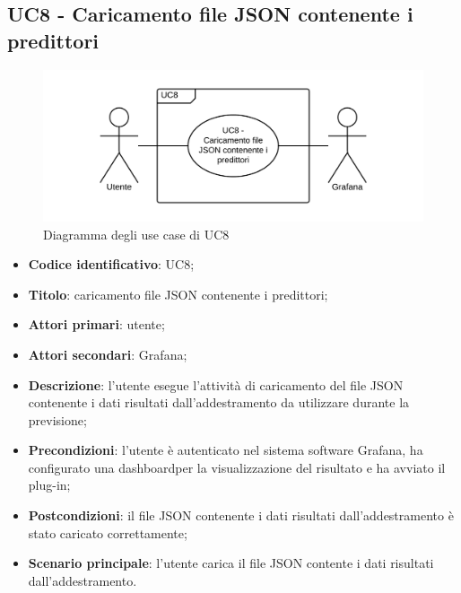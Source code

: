 \subsection{UC8 - Caricamento file JSON contenente i predittori}
\begin{figure}[H]
\includegraphics{img/UC8_-_Caricamento_file_JSON_contenente_i_predittori.png}
\caption{Diagramma degli use case di UC8}
\end{figure}
\begin{itemize}
	\item \textbf{Codice identificativo}: UC8;
	\item \textbf{Titolo}: caricamento file JSON contenente i predittori;
	\item \textbf{Attori primari}: utente;
	\item \textbf{Attori secondari}: Grafana\glo;
	\item \textbf{Descrizione}: l'utente esegue l'attività di caricamento del file JSON contenente i dati risultati dall'addestramento da utilizzare durante la previsione;
	\item \textbf{Precondizioni}: l'utente è autenticato nel sistema software Grafana\glosp, ha configurato una dashboard\glosp per la visualizzazione del risultato e ha avviato il plug-in;
	\item \textbf{Postcondizioni}: il file JSON contenente i dati risultati dall'addestramento è stato caricato correttamente;
	\item \textbf{Scenario principale}: l'utente carica il file JSON contente i dati risultati dall'addestramento.
\end{itemize}
